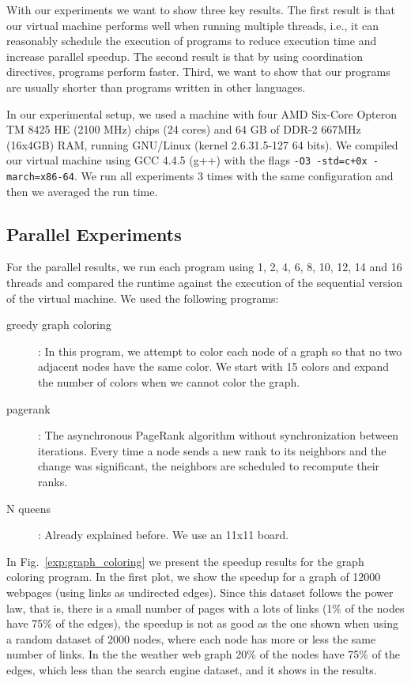 With our experiments we want to show three key results. The first result is that our virtual machine performs well when running multiple threads,
i.e., it can reasonably schedule the execution of programs to reduce execution time and increase parallel speedup. The second result is that by using coordination directives, programs perform faster. Third, we want to show that our programs are usually shorter than programs written in other languages.  

In our experimental setup, we used a machine with
four AMD Six-Core Opteron TM 8425 HE (2100 MHz) chips (24 cores) and 64 GB of DDR-2 667MHz (16x4GB) RAM,
     running GNU/Linux (kernel 2.6.31.5-127 64 bits).
     We compiled our virtual machine using GCC 4.4.5 (g++) with the flags \texttt{-O3 -std=c+0x -march=x86-64}.
     We run all experiments 3 times with the same configuration and then we averaged the run time.

\subsection{Parallel Experiments}

For the parallel results, we run each program using 1, 2, 4, 6, 8, 10, 12, 14 and 16 threads and compared the runtime against the execution of the sequential version of the virtual machine. We used the following programs:

\begin{description}
   \item[greedy graph coloring]: In this program, we attempt to color each node of a graph so that no two adjacent nodes have the same color. We start with 15 colors and expand the number of colors when we cannot color the graph.
   \item[pagerank]: The asynchronous PageRank algorithm without synchronization between iterations. Every time a node sends a new rank to its neighbors and the change was significant, the neighbors are scheduled to recompute their ranks.
   \item[N queens]: Already explained before. We use an 11x11 board.
\end{description}

In Fig.~\ref{exp:graph_coloring} we present the speedup results for the graph coloring program. In the first plot, we show the speedup for a graph of 12000 webpages (using links as undirected edges). Since this dataset follows the power law, that is, there is a small number of pages with a lots of links (1\% of the nodes have 75\% of the edges), the speedup is not as good as the one shown when using a random dataset of 2000 nodes, where each node has more or less the same number of links. In the the weather web graph 20\% of the nodes have 75\% of the edges, which less than the search engine dataset, and it shows in the results.

